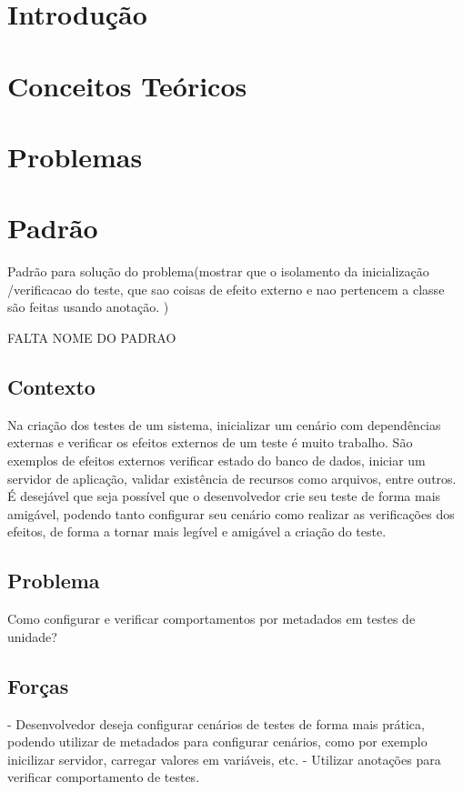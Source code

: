\documentclass[12pt,a4paper,oneside]{book}
\begin{document}


\chapter{Introdução}

\chapter{Conceitos Teóricos}

\chapter{Problemas}


\chapter{Padrão}

Padrão para solução do problema(mostrar que o isolamento da inicialização /verificacao do teste, que sao coisas de efeito externo e nao pertencem a classe são feitas  usando anotação. )

FALTA NOME DO PADRAO

\section{Contexto}
Na criação dos testes de um sistema, inicializar um cenário com dependências externas e verificar os efeitos externos de um teste é muito trabalho. São exemplos de efeitos externos verificar estado do banco de dados, iniciar um servidor de aplicação, validar existência de recursos como arquivos, entre outros. É desejável que seja possível que o desenvolvedor crie seu teste de forma mais amigável, podendo tanto configurar seu cenário como realizar as verificações dos efeitos, de forma a tornar mais legível e amigável a criação do teste.

\section{Problema}
Como configurar e verificar comportamentos por metadados em testes de unidade?

\section{Forças}
- Desenvolvedor deseja configurar cenários de testes de forma mais prática, podendo utilizar de metadados para configurar cenários, como por exemplo inicilizar servidor, carregar valores em variáveis, etc.
- Utilizar anotações para verificar comportamento de testes.
\end{document}
